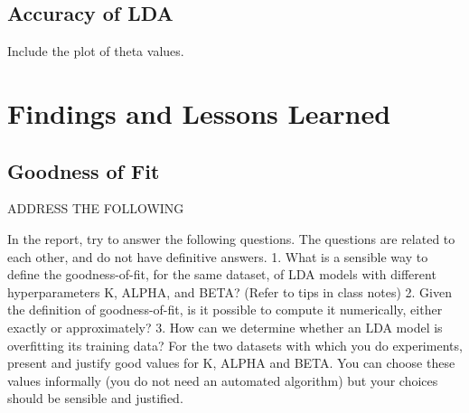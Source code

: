 \documentclass[11pt,a4paper,oneside]{article}
\begin{document}
\subsection{Accuracy of LDA}
Include the plot of theta values.

\section{Findings and Lessons Learned}
\label{Lessons}

\subsection{Goodness of Fit}
ADDRESS THE FOLLOWING

In the report, try to answer the following questions. The questions are related to each other, and do not have definitive answers.
1. What is a sensible way to define the goodness-of-fit, for the same dataset, of LDA models with different hyperparameters K, ALPHA, and BETA? (Refer to tips in class notes)
2. Given the definition of goodness-of-fit, is it possible to compute it numerically, either exactly or approximately?
3. How can we determine whether an LDA model is overfitting its training data?
For the two datasets with which you do experiments, present and justify good values for K, ALPHA and BETA. You can choose these values informally (you do not need an automated algorithm) but your choices should be sensible and justified.



\end{document}
